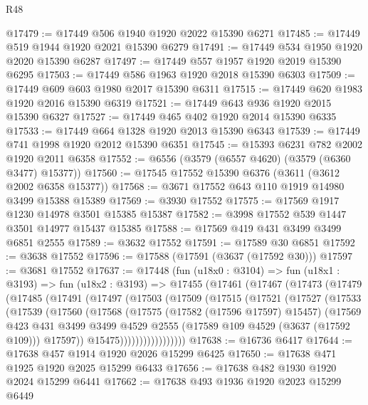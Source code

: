 \begin{lexlean}{R48}
\begin{coremodule}
@17479 := @17449 @506 @1940 @1920 @2022 @15390 @6271
@17485 := @17449 @519 @1944 @1920 @2021 @15390 @6279
@17491 := @17449 @534 @1950 @1920 @2020 @15390 @6287
@17497 := @17449 @557 @1957 @1920 @2019 @15390 @6295
@17503 := @17449 @586 @1963 @1920 @2018 @15390 @6303
@17509 := @17449 @609 @603 @1980 @2017 @15390 @6311
@17515 := @17449 @620 @1983 @1920 @2016 @15390 @6319
@17521 := @17449 @643 @936 @1920 @2015 @15390 @6327
@17527 := @17449 @465 @402 @1920 @2014 @15390 @6335
@17533 := @17449 @664 @1328 @1920 @2013 @15390 @6343
@17539 := @17449 @741 @1998 @1920 @2012 @15390 @6351
@17545 := @15393 @6231 @782 @2002 @1920 @2011 @6358
@17552 := @6556 (@3579 (@6557 @4620) (@3579 (@6360 @3477) @15377))
@17560 := @17545 @17552 @15390 @6376 (@3611 (@3612 @2002 @6358 @15377))
@17568 := @3671 @17552 @643 @110 @1919 @14980 @3499 @15388 @15389
@17569 := @3930 @17552
@17575 := @17569 @1917 @1230 @14978 @3501 @15385 @15387
@17582 := @3998 @17552 @539 @1447 @3501 @14977 @15437 @15385
@17588 := @17569 @419 @431 @3499 @3499 @6851 @2555
@17589 := @3632 @17552
@17591 := @17589 @30 @6851
@17592 := @3638 @17552
@17596 := @17588 (@17591 (@3637 (@17592 @30)))
@17597 := @3681 @17552
@17637 := @17448
    (fun (u18x0 : @3104) =>
    fun (u18x1 : @3193) =>
    fun (u18x2 : @3193) =>
    @17455
      (@17461
        (@17467
          (@17473
            (@17479
              (@17485
                (@17491
                  (@17497
                    (@17503
                      (@17509
                        (@17515
                          (@17521
                            (@17527
                              (@17533
                                (@17539
                                  (@17560
                                    (@17568
                                      (@17575
                                        (@17582 (@17596 @17597) @15457)
                                        (@17569
                                          @423
                                          @431
                                          @3499
                                          @3499
                                          @4529
                                          @2555
                                          (@17589 @109 @4529 (@3637 (@17592 @109)))
                                          @17597))
                                      @15475)))))))))))))))))
@17638 := @16736 @6417
@17644 := @17638 @457 @1914 @1920 @2026 @15299 @6425
@17650 := @17638 @471 @1925 @1920 @2025 @15299 @6433
@17656 := @17638 @482 @1930 @1920 @2024 @15299 @6441
@17662 := @17638 @493 @1936 @1920 @2023 @15299 @6449

\end{coremodule}
\end{lexlean}
